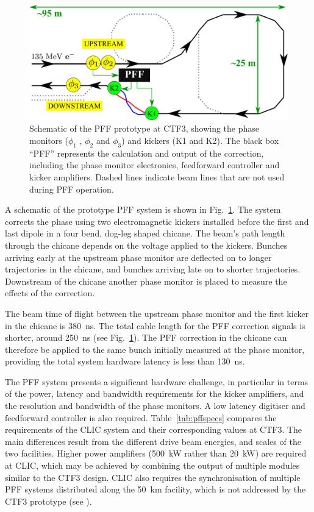 \documentclass[%
 reprint,
 superscriptaddress,
 amsmath,
 amssymb,
 prl,
]{revtex4-1}
\begin{document}
\begin{figure}
	\includegraphics[width=\columnwidth]{figs/ctfpffLayout}%
	\caption{\label{fig:pffLayout}Schematic of the PFF prototype at CTF3, 
	showing the phase monitors (\(\phi_1\) , 
	\(\phi_2\) and \(\phi_3\)) and kickers (K1 and K2). The black box “PFF” 
	represents the calculation and output of the correction, including the 
	phase monitor electronics, feedforward controller and kicker amplifiers.
	Dashed lines indicate beam lines that are not used during PFF operation. 
		}
\end{figure}

A schematic of the prototype PFF system is shown in Fig.~\ref{fig:pffLayout}. 
The system corrects the phase using two electromagnetic kickers installed 
before the first and last dipole in a four bend, dog-leg shaped chicane. The 
beam's path length through the chicane depends on the voltage applied to the 
kickers. Bunches arriving early at the upstream 
phase monitor are deflected on to longer trajectories 
in the chicane, and bunches arriving late on to shorter trajectories. 
Downstream of the chicane another phase monitor is placed to measure the 
effects of the correction.

The beam time of flight between the upstream phase monitor and the first kicker 
in the chicane is 380~ns. The total cable length for the PFF correction signals 
is shorter, around 250~ns (see Fig.~\ref{fig:pffLayout}). The PFF correction in 
the chicane can therefore be applied to the same bunch initially measured at 
the phase monitor, providing the total system hardware latency is less than 
130~ns. 

The PFF system presents a significant hardware challenge, in particular in 
terms of the power, latency and bandwidth requirements for the kicker 
amplifiers, and the resolution and bandwidth of the phase monitors. A low 
latency digitiser and feedforward controller is also required.
Table~\ref{tab:pffspecs} compares the requirements of the CLIC system and their 
corresponding values at CTF3. 
The main differences result from the different drive beam energies, and scales 
of the two facilities. Higher power amplifiers (500~kW rather than 20~kW) are 
required at CLIC, which may be achieved by combining the output of multiple 
modules similar to the CTF3 design. CLIC also requires the 
synchronisation of multiple PFF systems distributed along the 50~km facility, 
which is not addressed by the CTF3 prototype (see \cite{CLICCDR}).
\end{document}
